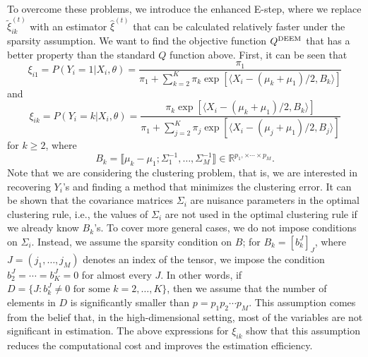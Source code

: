 \documentclass[11pt]{article}
\newcommand{\br}[1]{\llbracket #1 \rrbracket}
\newcommand{\wh}{\widehat}
\newcommand{\wt}{\widetilde}
\begin{document}
To overcome these problems, we introduce the enhanced E-step, where we replace $\wt\xi^{(t)}_{ik}$ with an estimator $\wh\xi^{(t)}$ that can be calculated relatively faster under the sparsity assumption. 
We want to find the objective function $Q^{\textup{DEEM}}$ that has a better property than the standard $Q$ function above. First, it can be seen that
\begin{equation}\label{xi1}
  \xi_{i1}=P(Y_i=1|X_i, \theta) = \frac{\pi_1}{\pi_1 + \sum_{k=2}^K \pi_k \exp\left[ \langle X_i - (\mu_k+\mu_1)/2 , B_k \rangle \right]}
\end{equation}
and
\begin{equation}\label{xi2}
  \xi_{ik}=P(Y_i=k|X_i, \theta) = \frac{\pi_k \exp \left[ \langle X_i - (\mu_k+\mu_1)/2 , B_k \rangle \right]}{\pi_1 + \sum_{j=2}^K \pi_j \exp\left[ \langle X_i - (\mu_j+\mu_1)/2 , B_j \rangle \right]}
\end{equation}
for $k\ge2$, where
\begin{equation*}
  B_k = \br{\mu_k - \mu_1 ; \Sigma_1^{-1} , \dots , \Sigma_M^{-1}}\in  \mathbb{R}^{p_1,\times \cdots \times p_M}.
\end{equation*}
Note that we are considering the clustering problem, that is, we are interested in recovering $Y_i$'s and finding a method that minimizes the clustering error.
It can be shown that the covariance matrices $\Sigma_i$ are nuisance parameters in the optimal clustering rule, i.e., 
the values of $\Sigma_i$ are not used in the optimal clustering rule if we already know $B_k$'s.
To cover more general cases, we do not impose conditions on $\Sigma_i$.
Instead, we assume the sparsity condition on $B$; for $B_k=[b^J_k]_{J}$, where $J=(j_1,\dots, j_M)$ denotes an index of the tensor, we impose the condition $b_2^J=\cdots = b_K^J=0 $ for almost every $J$. In other words, if 
$D= \{J : b_k^J \neq 0 \text{ for some $k=2,\dots, K$} \}$, then we assume that the number of elements in $D$ is significantly smaller than $p=p_1p_2 \cdots p_M$. This assumption comes from the belief that, in the high-dimensional setting, most of the variables are not significant in estimation.
The above expressions for $\xi_{ik}$ show that this assumption reduces the computational cost and improves the estimation efficiency.
\end{document}
